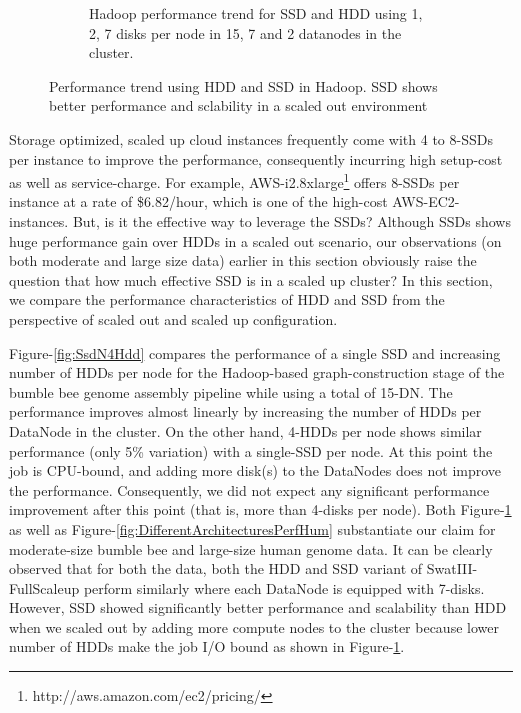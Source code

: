 \documentclass[conference]{IEEEtran}
\begin{document}
\begin{figure}[h]
\begin{subfigure}[b]{0.23\textwidth}
          \caption{Hadoop performance trend for SSD and HDD using 1, 2, 7 disks per node in 15, 7 and 2 datanodes in the cluster.}
          \label{fig:SsdNHddDiffNodes}
  \end{subfigure}
  \caption{Performance trend using HDD and SSD in Hadoop. SSD shows better performance and sclability in a scaled out environment}
  \label{fig:SsdNHdd}
  \vspace{-1.9em}
\end{figure}

Storage optimized, scaled up cloud instances frequently come with 4 to 8-SSDs per instance to improve the performance, consequently incurring high setup-cost as well as service-charge. For example, AWS-i2.8xlarge\footnote{http://aws.amazon.com/ec2/pricing/} offers 8-SSDs per instance at a rate of \$6.82/hour, which is one of the high-cost AWS-EC2-instances. But, is it the effective way to leverage the SSDs? Although SSDs shows huge performance gain over HDDs in a scaled out scenario, our observations (on both moderate and large size data) earlier in this section obviously raise the question that how much effective SSD is in a scaled up cluster? In this section, we compare the performance characteristics of HDD and SSD from the perspective of scaled out and scaled up configuration.

Figure-\ref{fig:SsdN4Hdd} compares the performance of a single SSD and increasing number of HDDs per node for the Hadoop-based graph-construction stage of the bumble bee genome assembly pipeline while using a total of 15-DN. The performance improves almost linearly by increasing the number of HDDs per DataNode in the cluster. On the other hand, 4-HDDs per node shows similar performance (only 5\% variation) with a single-SSD per node.
At this point the job is CPU-bound, and adding more disk(s) to the DataNodes does not improve the performance. Consequently, we did not expect any significant performance improvement after this point (that is, more than 4-disks per node). Both Figure-\ref{fig:SsdNHddDiffNodes} as well as Figure-\ref{fig:DifferentArchitecturesPerfHum} substantiate our claim for moderate-size bumble bee and large-size human genome data. It can be clearly observed that for both the data, both the HDD and SSD variant of SwatIII-FullScaleup perform similarly where each DataNode is equipped with 7-disks. However, SSD showed significantly better performance and scalability than HDD when we scaled out by adding more compute nodes to the cluster because lower number of HDDs make the job I/O bound as shown in Figure-\ref{fig:SsdNHddDiffNodes}.
\end{document}
